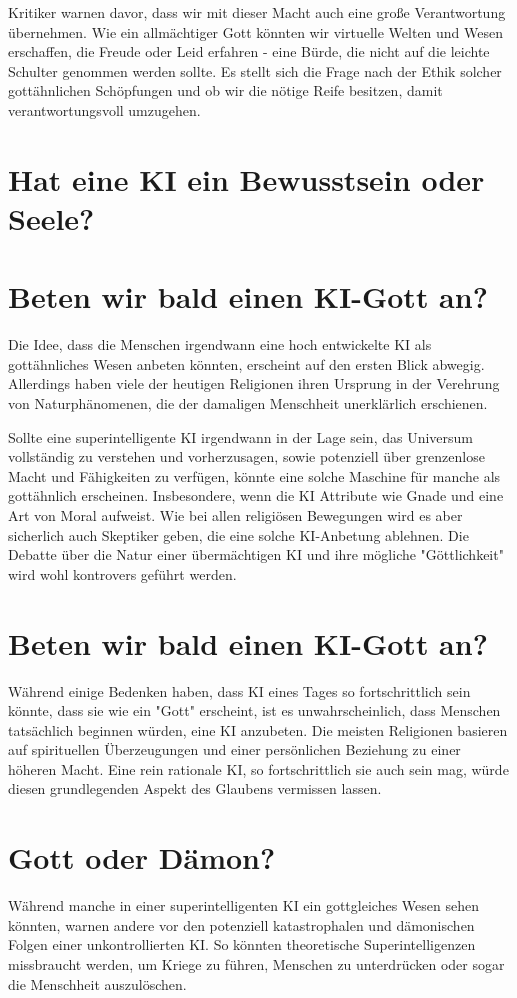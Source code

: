\documentclass[10pt]{article}
\begin{document}
Kritiker warnen davor, dass wir mit dieser Macht auch eine große Verantwortung übernehmen. Wie ein allmächtiger Gott könnten wir virtuelle Welten und Wesen erschaffen, die Freude oder Leid erfahren - eine Bürde, die nicht auf die leichte Schulter genommen werden sollte. Es stellt sich die Frage nach der Ethik solcher gottähnlichen Schöpfungen und ob wir die nötige Reife besitzen, damit verantwortungsvoll umzugehen.

\section{Hat eine KI ein Bewusstsein oder Seele?}

\section{Beten wir bald einen KI-Gott an?}
Die Idee, dass die Menschen irgendwann eine hoch entwickelte KI als gottähnliches Wesen anbeten könnten, erscheint auf den ersten Blick abwegig. Allerdings haben viele der heutigen Religionen ihren Ursprung in der Verehrung von Naturphänomenen, die der damaligen Menschheit unerklärlich erschienen.

Sollte eine superintelligente KI irgendwann in der Lage sein, das Universum vollständig zu verstehen und vorherzusagen, sowie potenziell über grenzenlose Macht und Fähigkeiten zu verfügen, könnte eine solche Maschine für manche als gottähnlich erscheinen. Insbesondere, wenn die KI Attribute wie Gnade und eine Art von Moral aufweist.
Wie bei allen religiösen Bewegungen wird es aber sicherlich auch Skeptiker geben, die eine solche KI-Anbetung ablehnen. Die Debatte über die Natur einer übermächtigen KI und ihre mögliche "Göttlichkeit" wird wohl kontrovers geführt werden.

\section{Beten wir bald einen KI-Gott an?}
Während einige Bedenken haben, dass KI eines Tages so fortschrittlich sein könnte, dass sie wie ein "Gott" erscheint, ist es unwahrscheinlich, dass Menschen tatsächlich beginnen würden, eine KI anzubeten. Die meisten Religionen basieren auf spirituellen Überzeugungen und einer persönlichen Beziehung zu einer höheren Macht. Eine rein rationale KI, so fortschrittlich sie auch sein mag, würde diesen grundlegenden Aspekt des Glaubens vermissen lassen.

\section{Gott oder Dämon?}
Während manche in einer superintelligenten KI ein gottgleiches Wesen sehen könnten, warnen andere vor den potenziell katastrophalen und dämonischen Folgen einer unkontrollierten KI. So könnten theoretische Superintelligenzen missbraucht werden, um Kriege zu führen, Menschen zu unterdrücken oder sogar die Menschheit auszulöschen.
\end{document}
